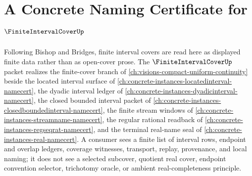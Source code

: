\chapter{A Concrete Naming Certificate for $\FiniteIntervalCoverUp$}
\label{ch:concrete-instances-finite-interval-cover-namecert}

Following Bishop and Bridges, finite interval covers are read here as displayed finite data rather than as open-cover prose. The $\FiniteIntervalCoverUp$ packet realizes the finite-cover branch of \autoref{ch:visions-compact-uniform-continuity} beside the located interval surface of \autoref{ch:concrete-instances-locatedinterval-namecert}, the dyadic interval ledger of \autoref{ch:concrete-instances-dyadicinterval-namecert}, the closed bounded interval packet of \autoref{ch:concrete-instances-closedboundedinterval-namecert}, the finite stream windows of \autoref{ch:concrete-instances-streamname-namecert}, the regular rational readback of \autoref{ch:concrete-instances-regseqrat-namecert}, and the terminal real-name seal of \autoref{ch:concrete-instances-real-namecert}. A consumer sees a finite list of interval rows, endpoint and overlap ledgers, coverage witnesses, transport, replay, provenance, and local naming; it does not see a selected subcover, quotient real cover, endpoint convention selector, trichotomy oracle, or ambient real-completeness principle.

